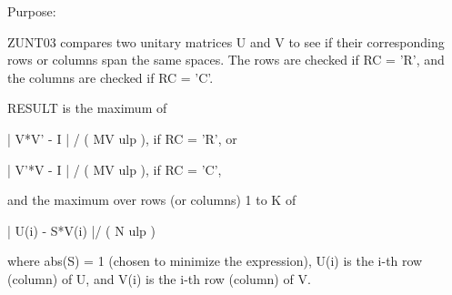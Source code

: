 \begin{DoxyParagraph}{Purpose\+: }
\begin{DoxyVerb} ZUNT03 compares two unitary matrices U and V to see if their
 corresponding rows or columns span the same spaces.  The rows are
 checked if RC = 'R', and the columns are checked if RC = 'C'.

 RESULT is the maximum of

    | V*V' - I | / ( MV ulp ), if RC = 'R', or

    | V'*V - I | / ( MV ulp ), if RC = 'C',

 and the maximum over rows (or columns) 1 to K of

    | U(i) - S*V(i) |/ ( N ulp )

 where abs(S) = 1 (chosen to minimize the expression), U(i) is the
 i-th row (column) of U, and V(i) is the i-th row (column) of V.\end{DoxyVerb}
 
\end{DoxyParagraph}

